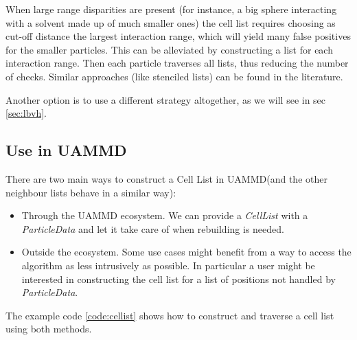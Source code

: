 \documentclass[twoside,openright,titlepage,numbers=noenddot,%
headinclude,footinclude,cleardoublepage=empty,abstract=on,
BCOR=5mm,fontsize=11pt, dvipsnames, paper=b5
]{scrreprt}
\newcommand{\uammd}{\gls{UAMMD}\xspace}
\begin{document}
When large range disparities are present (for instance, a big sphere interacting with a solvent made up of much smaller ones) the cell list requires choosing as cut-off distance the largest interaction range, which will yield many false positives for the smaller particles. This can be alleviated by constructing a list for each interaction range. Then each particle traverses all lists, thus reducing the number of checks. Similar approaches (like stenciled lists) can be found in the literature\cite{Howard2016}.

Another option is to use a different strategy altogether, as we will see in sec \ref{sec:lbvh}.
\subsection*{Use in UAMMD}
There are two main ways to construct a Cell List in \uammd (and the other neighbour lists behave in a similar way):
\begin{itemize}
\item Through the \uammd ecosystem.
  We can provide a \emph{CellList} with a \emph{ParticleData} and let it take care of when rebuilding is needed.
\item Outside the ecosystem.
  Some use cases might benefit from a way to access the algorithm as less intrusively as possible. In particular a user might be interested in constructing the cell list for a list of positions not handled by \emph{ParticleData}.
\end{itemize}
The example code \ref{code:cellist} shows how to construct and traverse a cell list using both methods.
\end{document}
